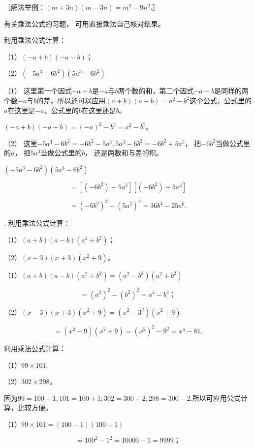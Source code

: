 ［解法举例：\((m+3n)(m-3n)=m^{2}-9n^{2}\).］

 有关乘法公式的习题， 可用直接乘法自己核对结果。

 利用乘法公式计算：

（1）\((-a + b)(-a - b)\)；

（2）\((-5a^{3} - 6b^{2})(5a^{3} - 6b^{2})\)

 （1）
这里第一个因式\(-a + b\)是\(-a\)与\(b\)两个数的和，第二个因式\(-a - b\)是同样的两个数\(-a\)与\(b\)的差，所以还可以应用\((a + b)(a - b) = a^2 - b^2\)这个公式，公式里的\(a\)在这里是\(-a\)，公式里的\(b\)在这里还是\(b\)。

\((-a + b)(-a - b) = (-a)^{2} - b^{2} = a^{2} - b^{2}\)。

 （2）
这里\(-5a^{3} - 6b^{2} = -6b^{2} - 5a^{3}, 5a^{3} - 6b^{2} = -6b^{2} + 5a^{3}\)，
把\(-6b^{2}\)当做公式里的\(a\)， 把\(5a^{3}\)当做公式里的\(b\)，
还是两数和与差的积。

\((-5a^{3} - 6b^{2})(5a^{3} - 6b^{2})\)

\[
= [ (- 6 b ^{2}) - 5 a ^{3} ] [ (- 6 b ^{2}) + 5 a ^{3} ]
\]

\[
= (- 6 b ^{2}) ^{2} - (5 a ^{3}) ^{2} = 36 b ^{4} - 25 a ^{6}.
\]

. 利用乘法公式计算：

（1）\((a + b)(a - b)(a^2 + b^2)\)；

（2）\((x - 3)(x + 3)(x^2 + 9)\)。

（1）\((a + b)(a - b)(a^2 + b^2) = (a^2 - b^2)(a^2 + b^2)\)

\[
= (a ^{2}) ^{2} - (b ^{2}) ^{2} = a ^{4} - b ^{4}\text{；}
\]

（2）\((x - 3)(x + 3)(x^2 + 9) = (x^2 - 3^2)(x^2 + 9)\)

\[
= (x ^{2} - 9) (x ^{2} + 9) = (x ^{2}) ^{2} - 9 ^{2} = x ^{4} - 81.
\]

 利用乘法公式计算：

（1）\(99 \times 101;\)

（2）\(302 \times 298\)。

因为\(99 = 100 - 1, 101 = 100 + 1; 302 = 300 + 2, 298 = 300 - 2.\)所以可应用公式计算，比较方便。

 （1）\(99 \times 101 = (100 - 1)(100 + 1)\)

\[
= 100 ^{2} - 1 ^{2} = 10000 - 1 = 9999\text{；}
\]

